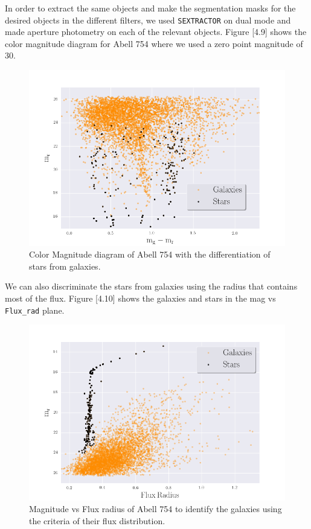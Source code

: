 In order to extract the same objects and make the segmentation masks for the desired objects in the different filters, we used \texttt{SEXTRACTOR} on dual mode and made aperture photometry on each of the relevant objects. Figure [4.9] shows the color magnitude diagram for Abell 754 where we used a zero point magnitude of 30.

\begin{figure}[H]
\centering
\includegraphics[width=12cm]{images/color_mag.png}
\caption[Color Magnitude diagram of Abell 754]{Color Magnitude diagram of Abell 754 with the differentiation of stars from galaxies.}
\end{figure}

We can also discriminate the stars from galaxies using the radius that contains most of the flux. Figure [4.10] shows the galaxies and stars in the mag vs \texttt{Flux\_rad} plane.

\begin{figure}[H]
\centering
\includegraphics[width=12cm]{images/mag_vs_flux_rad.png}
\caption[Magnitude vs Flux radius of Abell 754]{Magnitude vs Flux radius of Abell 754 to identify the galaxies using the criteria of their flux distribution.}
\end{figure}

